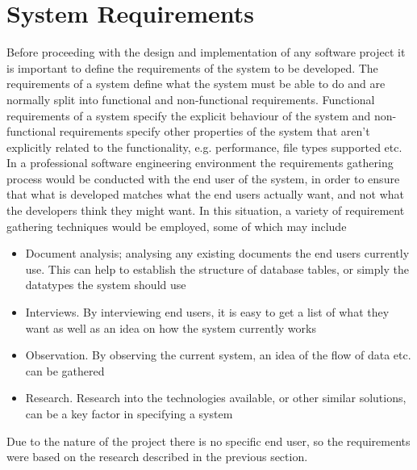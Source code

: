 \section{System Requirements}
\label{sec:require}
Before proceeding with the design and implementation of any software project it is important to define the requirements of the system to be developed. The requirements of a system define what the system must be able to do and are normally split into functional and non-functional requirements. Functional requirements of a system specify the explicit behaviour of the system and non-functional requirements specify other properties of the system that aren't explicitly related to the functionality, e.g. performance, file types supported etc.
\\In a professional software engineering environment the requirements gathering process would be conducted with the end user of the system, in order to ensure that what is developed matches what the end users actually want, and not what the developers think they might want. In this situation, a variety of requirement gathering techniques would be employed, some of which may include
\begin{itemize}
  \item{Document analysis; analysing any existing documents the end users currently use. This can help to establish the structure of database tables, or simply the datatypes the system should use}
  \item{Interviews. By interviewing end users, it is easy to get a list of what they want as well as an idea on how the system currently works}
  \item{Observation. By observing the current system, an idea of the flow of data etc. can be gathered}
  \item{Research. Research into the technologies available, or other similar solutions, can be a key factor in specifying a system}
\end{itemize}
Due to the nature of the project there is no specific end user, so the requirements were based on the research described in the previous section.

